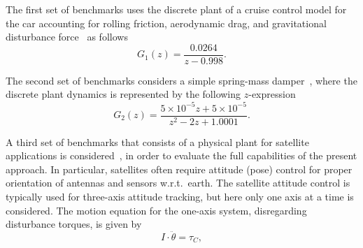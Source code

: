 \documentclass{sig-alternate-05-2015}
\begin{document}
The first set of benchmarks uses the discrete plant of a cruise control
model for the car accounting for rolling friction, aerodynamic drag, and
gravitational disturbance force~\cite{Astrom08} as follows
%
\begin{equation}
\label{cruise-control-c1}
G_1(z)=\frac{0.0264}{z-0.998}. \nonumber
\end{equation} 

%
%

The second set of benchmarks considers a simple spring-mass 
damper~\cite{DBLP:conf/hybrid/WangGRJF16}, where the discrete 
plant dynamics is represented by the following $z$-expression
%
%
\begin{equation}
\label{spring-mass-damper-g}
G_2(z)=\frac{5\times{10^{-5}}z + 5\times{10^{-5}}}{z^2 - 2z + 1.0001}. \nonumber
\end{equation} 
%

A third set of benchmarks that consists of a physical plant for satellite
applications is considered~\cite{Franklin15}, in order to evaluate the
full capabilities of the present approach.  In particular, satellites often require
attitude (pose) control for proper orientation of antennas and sensors
w.r.t.~earth.  The satellite attitude control is typically used for
three-axis attitude tracking, but here only one axis at a time is
considered.  The motion equation for the one-axis system, disregarding
disturbance torques, is given by
%
\begin{equation}
\label{eq:satelliteode}
I\cdot \ddot{\theta} = \tau_{C}, 
\end{equation}
\end{document}

